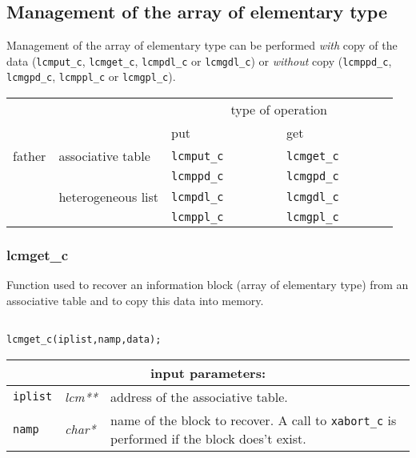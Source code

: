 \vskip 0.8cm

\subsection{Management of the array of elementary type}

Management of the array of elementary type can be performed {\sl with} copy of the data ({\tt lcmput\_c}, {\tt lcmget\_c}, {\tt lcmpdl\_c} or
{\tt lcmgdl\_c}) or {\sl without} copy ({\tt lcmppd\_c}, {\tt lcmgpd\_c}, {\tt lcmppl\_c} or
{\tt lcmgpl\_c}).

\vskip 0.4cm

\begin{center}
\begin{tabular}{|c|l|l|l|}
\cline{3-4}
\multicolumn{2}{c|}{} & \multicolumn{2}{c|}{type of operation} \\
\cline{3-4}
\multicolumn{2}{c|}{} & put~~~~~~~~~~~~~ & get~~~~~~~~~~~~~ \\
\hline
father & associative table & {\tt lcmput\_c} & {\tt lcmget\_c} \\
       &                   & {\tt lcmppd\_c} & {\tt lcmgpd\_c} \\
\cline{2-4}
       & heterogeneous list & {\tt lcmpdl\_c} & {\tt lcmgdl\_c} \\
       &                   & {\tt lcmppl\_c} & {\tt lcmgpl\_c} \\
\hline
\end{tabular}
\end{center}

\subsubsection{lcmget\_c}

Function used to recover an information block (array of elementary type) from an associative table and to copy
this data into memory.

\begin{verbatim}

lcmget_c(iplist,namp,data);
\end{verbatim}

\noindent
\begin{tabular}{|p{1.5cm}|p{2cm}|p{11cm}|}
\hline
\multicolumn{3}{|c|}{\bf input parameters:} \\
\hline
{\tt iplist} & {\it lcm**} & address of the associative table. \\
\hline
{\tt namp} & {\it char*} &  name of the block to recover. 
                                    A call to {\tt xabort\_c} is performed if the block does't exist. \\
\hline
\end{tabular}

